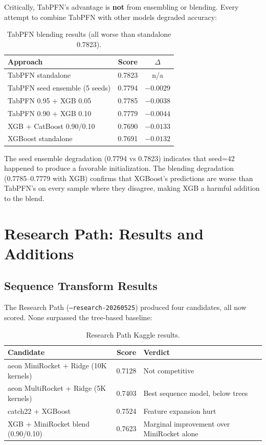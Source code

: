 \documentclass[12pt, a4paper]{article}
\begin{document}
Critically, TabPFN's advantage is \textbf{not} from ensembling or blending. Every attempt to combine TabPFN with other models degraded accuracy:

\begin{table}[h]
\centering
\caption{TabPFN blending results (all worse than standalone 0.7823).}
\label{tab:tabpfn_blend}
\begin{tabular}{@{}lcc@{}}
\toprule
\textbf{Approach} & \textbf{Score} & \textbf{$\Delta$} \\ \midrule
TabPFN standalone & 0.7823 & n/a \\
TabPFN seed ensemble (5 seeds) & 0.7794 & $-0.0029$ \\
TabPFN 0.95 + XGB 0.05 & 0.7785 & $-0.0038$ \\
TabPFN 0.90 + XGB 0.10 & 0.7779 & $-0.0044$ \\
XGB + CatBoost 0.90/0.10 & 0.7690 & $-0.0133$ \\
XGBoost standalone & 0.7691 & $-0.0132$ \\ \bottomrule
\end{tabular}
\end{table}

The seed ensemble degradation (0.7794 vs 0.7823) indicates that seed=42 happened to produce a favorable initialization. The blending degradation (0.7785--0.7779 with XGB) confirms that XGBoost's predictions are worse than TabPFN's on every sample where they disagree, making XGB a harmful addition to the blend.

\section{Research Path: Results and Additions}

\subsection{Sequence Transform Results}

The Research Path (\texttt{--research-20260525}) produced four candidates, all now scored. None surpassed the tree-based baseline:

\begin{table}[h]
\centering
\caption{Research Path Kaggle results.}
\label{tab:research_results}
\begin{tabularx}{\textwidth}{@{} Y c Y @{}}
\toprule
\textbf{Candidate} & \textbf{Score} & \textbf{Verdict} \\ \midrule
aeon MiniRocket + Ridge (10K kernels) & 0.7128 & Not competitive \\
aeon MultiRocket + Ridge (5K kernels) & 0.7403 & Best sequence model, below trees \\
catch22 + XGBoost & 0.7524 & Feature expansion hurt \\
XGB + MiniRocket blend (0.90/0.10) & 0.7623 & Marginal improvement over MiniRocket alone \\ \bottomrule
\end{tabularx}
\end{table}
\end{document}
